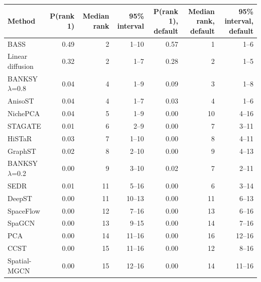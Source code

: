 \footnotesize
\begin{tabular}{lrrrrrr}
\toprule
Method & P(rank 1) & Median rank & 95\% interval & P(rank 1), default & Median rank, default & 95\% interval, default \\
\midrule
BASS & 0.49 & 2 & 1--10 & 0.57 & 1 & 1--6 \\
Linear diffusion & 0.32 & 2 & 1--7 & 0.28 & 2 & 1--5 \\
BANKSY $\lambda$=0.8 & 0.04 & 4 & 1--9 & 0.09 & 3 & 1--8 \\
AnisoST & 0.04 & 4 & 1--7 & 0.03 & 4 & 1--6 \\
NichePCA & 0.04 & 5 & 1--9 & 0.00 & 10 & 4--16 \\
STAGATE & 0.01 & 6 & 2--9 & 0.00 & 7 & 3--11 \\
HiSTaR & 0.03 & 7 & 1--10 & 0.00 & 8 & 4--11 \\
GraphST & 0.02 & 8 & 2--10 & 0.00 & 9 & 4--13 \\
BANKSY $\lambda$=0.2 & 0.00 & 9 & 3--10 & 0.02 & 7 & 2--11 \\
SEDR & 0.01 & 11 & 5--16 & 0.00 & 6 & 3--14 \\
DeepST & 0.00 & 11 & 10--13 & 0.00 & 11 & 6--13 \\
SpaceFlow & 0.00 & 12 & 7--16 & 0.00 & 13 & 6--16 \\
SpaGCN & 0.00 & 13 & 9--15 & 0.00 & 14 & 7--16 \\
PCA & 0.00 & 14 & 11--16 & 0.00 & 16 & 12--16 \\
CCST & 0.00 & 15 & 11--16 & 0.00 & 12 & 8--16 \\
Spatial-MGCN & 0.00 & 15 & 12--16 & 0.00 & 14 & 11--16 \\
\bottomrule
\end{tabular}
